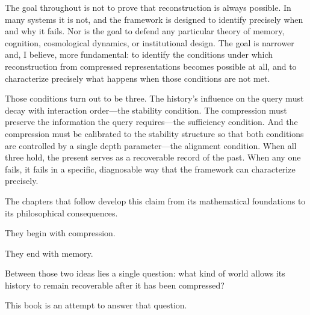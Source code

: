 The goal throughout is not to prove that reconstruction is always possible. In many systems it is not, and the framework is designed to identify precisely when and why it fails. Nor is the goal to defend any particular theory of memory, cognition, cosmological dynamics, or institutional design. The goal is narrower and, I believe, more fundamental: to identify the conditions under which reconstruction from compressed representations becomes possible at all, and to characterize precisely what happens when those conditions are not met.

Those conditions turn out to be three. The history's influence on the query must decay with interaction order---the stability condition. The compression must preserve the information the query requires---the sufficiency condition. And the compression must be calibrated to the stability structure so that both conditions are controlled by a single depth parameter---the alignment condition. When all three hold, the present serves as a recoverable record of the past. When any one fails, it fails in a specific, diagnosable way that the framework can characterize precisely.

The chapters that follow develop this claim from its mathematical foundations to its philosophical consequences.

They begin with compression.

They end with memory.

Between those two ideas lies a single question: what kind of world allows its history to remain recoverable after it has been compressed?

This book is an attempt to answer that question.
